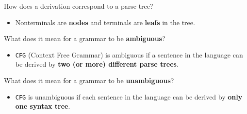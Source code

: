 \documentclass[11pt]{beamer}
\begin{document}
\begin{frame}


\begin{block}{How does a derivation correspond to a parse tree?}
\begin{itemize}
\item Nonterminals are \textbf{nodes} and terminals are \textbf{leafs} in the tree.
\end{itemize}
\end{block}


\begin{block}{What does it mean for a grammar to be \textbf{ambiguous}?}
\begin{itemize}
\item \texttt{CFG} (Context Free Grammar) is ambiguous if a sentence in the language can be derived by \textbf{two (or more) different parse trees}.
\end{itemize}
\end{block}


\begin{block}{What does it mean for a grammar to be \textbf{unambiguous}?}
\begin{itemize}
\item \texttt{CFG} is unambiguous if each sentence in the language can be derived by \textbf{only one syntax tree}.
\end{itemize}
\end{block}

\end{frame}
\end{document}
